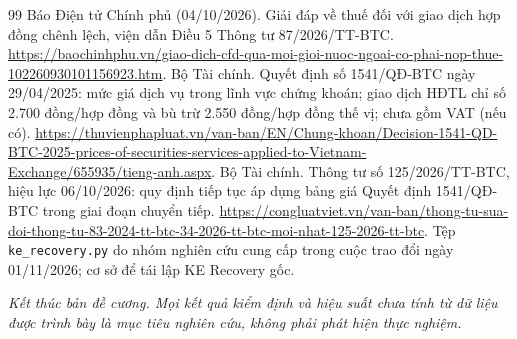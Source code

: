 \documentclass[12pt,a4paper,oneside]{article}
\begin{document}
\begin{thebibliography}{99}
 Báo Điện tử Chính phủ (04/10/2026). Giải đáp về thuế đối với giao dịch hợp đồng chênh lệch, viện dẫn Điều 5 Thông tư 87/2026/TT-BTC. \url{https://baochinhphu.vn/giao-dich-cfd-qua-moi-gioi-nuoc-ngoai-co-phai-nop-thue-102260930101156923.htm}.
 Bộ Tài chính. Quyết định số 1541/QĐ-BTC ngày 29/04/2025: mức giá dịch vụ trong lĩnh vực chứng khoán; giao dịch HĐTL chỉ số 2.700 đồng/hợp đồng và bù trừ 2.550 đồng/hợp đồng thế vị; chưa gồm VAT (nếu có). \url{https://thuvienphapluat.vn/van-ban/EN/Chung-khoan/Decision-1541-QD-BTC-2025-prices-of-securities-services-applied-to-Vietnam-Exchange/655935/tieng-anh.aspx}.
 Bộ Tài chính. Thông tư số 125/2026/TT-BTC, hiệu lực 06/10/2026: quy định tiếp tục áp dụng bảng giá Quyết định 1541/QĐ-BTC trong giai đoạn chuyển tiếp. \url{https://congluatviet.vn/van-ban/thong-tu-sua-doi-thong-tu-83-2024-tt-btc-34-2026-tt-btc-moi-nhat-125-2026-tt-btc}.
 Tệp \texttt{ke\_recovery.py} do nhóm nghiên cứu cung cấp trong cuộc trao đổi ngày 01/11/2026; cơ sở để tái lập KE Recovery gốc.
\end{thebibliography}

\vspace{1cm}
\begin{center}\small\color{muted}
\textit{Kết thúc bản đề cương. Mọi kết quả kiểm định và hiệu suất chưa tính từ dữ liệu được trình bày là mục tiêu nghiên cứu, không phải phát hiện thực nghiệm.}
\end{center}
\end{document}
